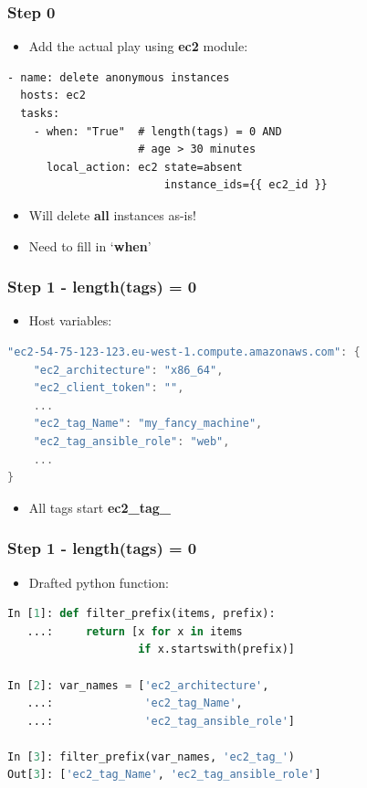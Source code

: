 \documentclass{beamer}
\begin{document}
\begin{frame}[fragile]\frametitle{Step 0}

    \begin{itemize}
        \item Add the actual play using \textbf{ec2} module:
    \end{itemize}

    \begin{lstlisting}
- name: delete anonymous instances
  hosts: ec2
  tasks:
    - when: "True"  # length(tags) = 0 AND
                    # age > 30 minutes
      local_action: ec2 state=absent
                        instance_ids={{ ec2_id }}
    \end{lstlisting}

    \begin{itemize}
        \item Will delete \textbf{all} instances as-is!
        \item Need to fill in `\textbf{when}'
    \end{itemize}

\end{frame}


\begin{frame}[fragile]\frametitle{Step 1 - length(tags) = 0}

    \begin{itemize}
        \item Host variables:
    \end{itemize}

    \begin{lstlisting}[language=C]
"ec2-54-75-123-123.eu-west-1.compute.amazonaws.com": {
    "ec2_architecture": "x86_64",
    "ec2_client_token": "",
    ...
    "ec2_tag_Name": "my_fancy_machine",
    "ec2_tag_ansible_role": "web",
    ...
}
    \end{lstlisting}

    \begin{itemize}
        \item All tags start \textbf{ec2\_tag\_}
    \end{itemize}

\end{frame}


\begin{frame}[fragile]\frametitle{Step 1 - length(tags) = 0}

    \begin{itemize}
        \item Drafted python function:
    \end{itemize}

    \begin{lstlisting}[language=Python]
In [1]: def filter_prefix(items, prefix):
   ...:     return [x for x in items
                    if x.startswith(prefix)]

In [2]: var_names = ['ec2_architecture',
   ...:              'ec2_tag_Name',
   ...:              'ec2_tag_ansible_role']

In [3]: filter_prefix(var_names, 'ec2_tag_')
Out[3]: ['ec2_tag_Name', 'ec2_tag_ansible_role']
    \end{lstlisting}

\end{frame}
\end{document}
